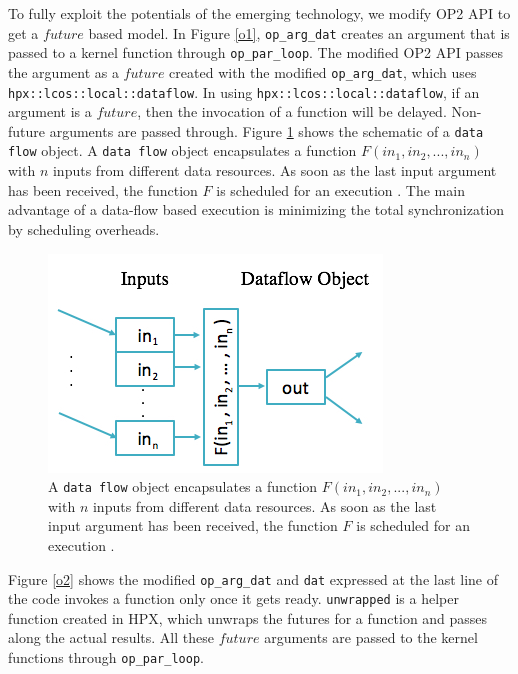 \documentclass[conference]{IEEEtran}
\begin{document}
To fully exploit the potentials of the emerging technology, we modify OP2 API to get a $future$ based model. In Figure \ref{o1}, \texttt{op\_arg\_dat} creates an argument that is passed to a kernel function through \texttt{op\_par\_loop}. The modified OP2 API passes the argument as a $future$ created with the modified \texttt{op\_arg\_dat}, which uses \texttt{hpx::lcos::local::dataflow}. In using \texttt{hpx::lcos::local::dataflow}, if an argument is a $future$, then the invocation of a function will be delayed. Non-future arguments are passed through. Figure \ref{o3} shows the schematic of a \texttt{data flow} object. A \texttt{data flow} object encapsulates a function $F(in_1,in_2,...,in_n)$ with $n$ inputs from different data resources. As soon as the last input argument has been received, the function $F$ is scheduled for an execution \cite{r7}. The main advantage of a data-flow based execution is minimizing the total synchronization by scheduling overheads. 


\begin{figure} 
\begin{center}
\centering
\includegraphics[width=0.65\columnwidth]{Pictures/tree.jpg}
\caption {A \texttt{data flow} object encapsulates a function $F(in_1,in_2,...,in_n)$ with $n$ inputs from different data resources. As soon as the last input argument has been received, the function $F$ is scheduled for an execution \cite{r7}.}
\label{o3}
\end{center}
\end{figure}



Figure \ref{o2} shows the modified \texttt{op\_arg\_dat} and \texttt{dat} expressed at the last line of the code invokes a function only once it gets ready. \texttt{unwrapped} is a helper function created in HPX, which unwraps the futures for a function and passes along the actual results. All these $future$ arguments are passed to the kernel functions through \texttt{op\_par\_loop}.
\end{document}
